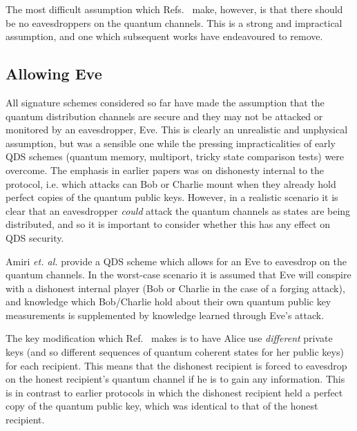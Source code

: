 The most difficult assumption which Refs.~\cite{Andersson2006, Clarke2012, Dunjko2014, Collins2014} make, however, is that there should be no eavesdroppers on the quantum channels. This is a strong and impractical assumption, and one which subsequent works have endeavoured to remove.

\subsection{Allowing Eve}
All signature schemes considered so far have made the assumption that the quantum distribution channels are secure and they may not be attacked or monitored by an eavesdropper, Eve. This is clearly an unrealistic and unphysical assumption, but was a sensible one while the pressing impracticalities of early QDS schemes (quantum memory, multiport, tricky state comparison tests) were overcome. The emphasis in earlier papers was on dishonesty internal to the protocol, i.e. which attacks can Bob or Charlie mount when they already hold perfect copies of the quantum public keys. However, in a realistic scenario it is clear that an eavesdropper \emph{could} attack the quantum channels as states are being distributed, and so it is important to consider whether this has any effect on QDS security.

Amiri \emph{et. al.} \cite{Amiri2016} provide a QDS scheme which allows for an Eve to eavesdrop on the quantum channels. In the worst-case scenario it is assumed that Eve will conspire with a dishonest internal player (Bob or Charlie in the case of a forging attack), and knowledge which Bob/Charlie hold about their own quantum public key measurements is supplemented by knowledge learned through Eve's attack. %

The key modification which Ref.~\cite{Amiri2016} makes is to have Alice use \emph{different} private keys (and so different sequences of quantum coherent states for her public keys) for each recipient. This means that the dishonest recipient is forced to eavesdrop on the honest recipient's quantum channel if he is to gain any information. This is in contrast to earlier protocols in which the dishonest recipient held a perfect copy of the quantum public key, which was identical to that of the honest recipient. 

